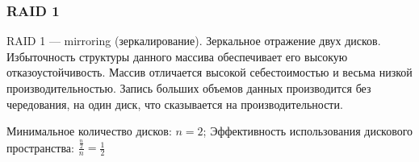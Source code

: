 \begin{frame}
    \frametitle{RAID 1}
    
    \begin{figure}
        \begin{center}
            \label{pict:raid1}
        \end{center}
    \end{figure} 
\end{frame}

RAID 1 --- mirroring (зеркалирование). Зеркальное отражение двух дисков. Избыточность структуры данного массива обеспечивает его высокую отказоустойчивость. Массив отличается высокой себестоимостью и весьма низкой производительностью. Запись больших объемов данных производится без чередования, на один диск, что сказывается на производительности.

Минимальное количество дисков: $n=2$; Эффективность использования дискового пространства: $\frac{\frac{n}{2}}{n}=\frac{1}{2}$

